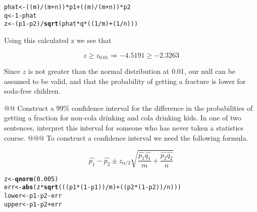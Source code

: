 \documentclass[10pt]{article}\usepackage[]{graphicx}\usepackage[]{xcolor}
\makeatletter
\newcommand{\hlnum}[1]{\textcolor[rgb]{0.686,0.059,0.569}{#1}}%
\newcommand{\hlopt}[1]{\textcolor[rgb]{0,0,0}{#1}}%
\newcommand{\hlstd}[1]{\textcolor[rgb]{0.345,0.345,0.345}{#1}}%
\newcommand{\hlkwb}[1]{\textcolor[rgb]{0.69,0.353,0.396}{#1}}%
\newcommand{\hlkwd}[1]{\textcolor[rgb]{0.737,0.353,0.396}{\textbf{#1}}}%
\newenvironment{kframe}{%
 \def\at@end@of@kframe{}%
 \ifinner\ifhmode%
  \def\at@end@of@kframe{\end{minipage}}%
  \begin{minipage}{\columnwidth}%
 \fi\fi%
 \def\FrameCommand##1{\hskip\@totalleftmargin \hskip-\fboxsep
 \colorbox{shadecolor}{##1}\hskip-\fboxsep
     \hskip-\linewidth \hskip-\@totalleftmargin \hskip\columnwidth}%
 \MakeFramed {\advance\hsize-\width
   \@totalleftmargin\z@ \linewidth\hsize
   \@setminipage}}%
 {\par\unskip\endMakeFramed%
 \at@end@of@kframe}
\newenvironment{knitrout}{}{} %
\makeatother
\begin{document}
\begin{easylist}[enumerate]
\begin{knitrout}
\color{fgcolor}\begin{kframe}
\begin{alltt}
             \hlstd{phat} \hlkwb{<-} \hlstd{((m)}\hlopt{/}\hlstd{(m} \hlopt{+} \hlstd{n))}\hlopt{*}\hlstd{p1} \hlopt{+} \hlstd{((m)}\hlopt{/}\hlstd{(m} \hlopt{+} \hlstd{n))}\hlopt{*}\hlstd{p2}
             \hlstd{q} \hlkwb{<-} \hlnum{1} \hlopt{-} \hlstd{phat}
             \hlstd{z} \hlkwb{<-} \hlstd{(p1} \hlopt{-} \hlstd{p2)} \hlopt{/} \hlkwd{sqrt}\hlstd{(phat} \hlopt{*} \hlstd{q} \hlopt{*} \hlstd{((}\hlnum{1} \hlopt{/} \hlstd{m)} \hlopt{+} \hlstd{(}\hlnum{1} \hlopt{/} \hlstd{n)))}
\end{alltt}
\end{kframe}
\end{knitrout}


    Using this calculated z we see that

    \[
        z \ge z_{0.01} \Rightarrow -4.5191 \ge -2.3263
    \]

    Since $z$ is not greater than the normal distribution at 0.01, our null can be assumed to be valid, and that the
    probability of getting a fracture is lower for soda-free children.

    @@ Construct a 99\% confidence interval for the difference in the probabilities of getting a fraction for non-cola
    drinking and cola drinking kids. In one of two sentences, interpret this interval for someone who has never taken a
    statistics course.
    @@@ To construct a confidence interval we need the following formula.

    \[
        \hat{p_1} - \hat{p_2} \pm z_{\alpha / 2} \sqrt{\frac{\hat{p_1}\hat{q_1}}{m} + \frac{\hat{p_2}\hat{q_2}}{n}}
    \]

\begin{knitrout}
\color{fgcolor}\begin{kframe}
\begin{alltt}
             \hlstd{z} \hlkwb{<-} \hlkwd{qnorm}\hlstd{(}\hlnum{0.005}\hlstd{)}
             \hlstd{err} \hlkwb{<-} \hlkwd{abs}\hlstd{(z} \hlopt{*} \hlkwd{sqrt}\hlstd{(((p1} \hlopt{*} \hlstd{(}\hlnum{1} \hlopt{-} \hlstd{p1))}\hlopt{/}\hlstd{m)} \hlopt{+} \hlstd{((p2} \hlopt{*} \hlstd{(}\hlnum{1} \hlopt{-} \hlstd{p2))}\hlopt{/}\hlstd{n)))}
             \hlstd{lower} \hlkwb{<-} \hlstd{p1} \hlopt{-} \hlstd{p2} \hlopt{-} \hlstd{err}
             \hlstd{upper} \hlkwb{<-} \hlstd{p1} \hlopt{-} \hlstd{p2} \hlopt{+} \hlstd{err}
\end{alltt}
\end{kframe}
\end{knitrout}



\end{easylist}
\end{document}
